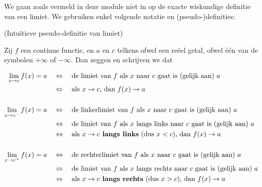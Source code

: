 \documentclass{ximera}
\begin{document}


We gaan zoals vermeld in deze module niet in op de exacte wiskundige definitie van een limiet. We gebruiken enkel volgende notatie en (pseudo-)definities:

\begin{definition} (Intuïtieve pseudo-definitie van limiet)
	
	Zij $f$ een continue functie, en $a$ en $c$ telkens ofwel een reëel getal, ofwel één van de symbolen $+\infty$ of $-\infty$. 
	Dan zeggen en schrijven we dat 

\begin{align*}
	\limxc  f(x) = a & \quad\iff\quad \text{de limiet van $f$ als $x$ naar $c$ gaat is (gelijk aan) $a$} \\
	                   & \quad\iff\quad \text{als }x\to c\text{, dan } 									f(x) \to a \\
	                   \\
	\llimxc f(x) = a & \quad\iff\quad \text{de linkerlimiet van $f$ als $x$ naar $c$ gaat is (gelijk aan) $a$} \\
	                   & \quad\iff\quad \text{de limiet van $f$ als $x$ langs links naar $c$ gaat is (gelijk aan) $a$} \\
	                   & \quad\iff\quad \text{als }x\to c\text{\textbf{ langs links} (dus $x<c$), dan } f(x) \to a \\
	                   \\
	\rlimxc f(x) = a & \quad\iff\quad \text{de rechterlimiet van $f$ als $x$ naar $c$ gaat is (gelijk aan) $a$} \\
					   & \quad\iff\quad \text{de limiet van $f$ als $x$ langs rechts naar $c$ gaat is (gelijk aan) $a$} \\
					   & \quad\iff\quad \text{als }x\to c\text{\textbf{ langs rechts} (dus $x>c$), dan }f(x) \to a 
\end{align*}

\end{definition}
\end{document}
